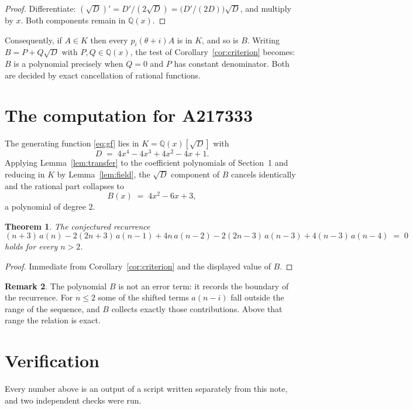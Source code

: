 \documentclass[11pt,a4paper]{article}
\theoremstyle{plain}
\newtheorem{theorem}{Theorem}
\theoremstyle{definition}
\newtheorem{remark}[theorem]{Remark}
\begin{document}
\begin{proof}
Differentiate: $(\sqrt{D})'=D'/(2\sqrt{D})=\bigl(D'/(2D)\bigr)\sqrt{D}$, and multiply by
$x$. Both components remain in $\mathbb{Q}(x)$.
\end{proof}

Consequently, if $A\in K$ then every $p_{i}(\theta+i)A$ is in $K$, and so is $B$. Writing
$B=P+Q\sqrt{D}$ with $P,Q\in\mathbb{Q}(x)$, the test of Corollary~\ref{cor:criterion}
becomes: $B$ is a polynomial precisely when $Q=0$ and $P$ has constant denominator. Both
are decided by exact cancellation of rational functions.

\section{The computation for A217333}

The generating function \eqref{eq:gf} lies in $K=\mathbb{Q}(x)[\sqrt{D}]$ with
\[
D \;=\; 4 x^{4} - 4 x^{3} + 4 x^{2} - 4 x + 1 .
\]
Applying Lemma~\ref{lem:transfer} to the coefficient polynomials of Section~1 and reducing
in $K$ by Lemma~\ref{lem:field}, the $\sqrt{D}$ component of $B$ cancels identically and
the rational part collapses to
\[
B(x)\;=\;4 x^{2} - 6 x + 3 ,
\]
a polynomial of degree $2$.

\begin{theorem}
The conjectured recurrence
\[
(n + 3)\,a(n) -  2 \left(2 n + 3\right)\,a(n-1) + 4 n\,a(n-2) -  2 \left(2 n - 3\right)\,a(n-3) + 4 \left(n - 3\right)\,a(n-4) \;=\;0
\]
holds for every $n>2$.
\end{theorem}

\begin{proof}
Immediate from Corollary~\ref{cor:criterion} and the displayed value of $B$.
\end{proof}

\begin{remark}
The polynomial $B$ is not an error term: it records the boundary of the recurrence. For
$n\le2$ some of the shifted terms $a(n-i)$ fall outside the range of the sequence,
and $B$ collects exactly those contributions. Above that range the relation is exact.
\end{remark}

\section{Verification}

Every number above is an output of a script written separately from this note, and two
independent checks were run.
\end{document}

